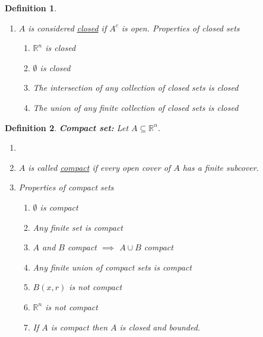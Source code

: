 \documentclass[]{article}
\newcommand{\R}{\mathbb{R}}
\newtheorem{definition}{Definition}
\begin{document}
\begin{definition}
\begin{enumerate}
\[            \partial A := \overline{A} \backslash A^\circ
        \] \item $A$ is considered \emph{\underline{closed}} if $A^c$ is open. 
        Properties of closed sets \begin{enumerate}
            \item $\R^n$ is closed
            \item $\emptyset$ is closed
            \item The intersection of any collection of closed sets is closed
            \item The union of any finite collection of closed sets is closed
        \end{enumerate}
    \end{enumerate}
\end{definition}

\begin{definition}
    \emph{\textbf{Compact set:}} 
    Let $A \subseteq \R^n$. 
    \begin{enumerate}
        \item 
        \item $A$ is called \emph{\underline{compact}} if every open cover of $A$ has a finite subcover.
        \item Properties of compact sets \begin{enumerate}
            \item $\emptyset$ is compact
            \item Any finite set is compact
            \item $A$ and $B$ compact $\implies$ $A \cup B$ compact
            \item Any finite union of compact sets is compact
            \item $B(x,r)$ is not compact
            \item $\R^n$ is not compact
            \item If $A$ is compact then $A$ is closed and bounded.
        \end{enumerate}
    \end{enumerate}
\end{definition}
\end{document}
